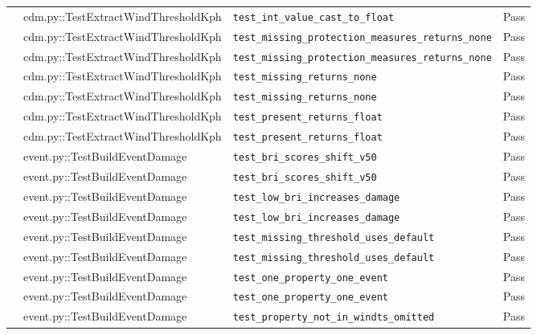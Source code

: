 \documentclass[11pt,a4paper]{article}
\begin{document}
\begin{center}
\begin{longtable}{p{2.2cm} p{4.5cm} p{6.5cm} p{1.4cm}}
     & cdm.py::TestExtractWindThresholdKph & \texttt{test\_int\_value\_cast\_to\_float} & \textcolor{green!60!black}{Pass} \\
     & cdm.py::TestExtractWindThresholdKph & \texttt{test\_missing\_protection\_measures\_returns\_none} & \textcolor{green!60!black}{Pass} \\
     & cdm.py::TestExtractWindThresholdKph & \texttt{test\_missing\_protection\_measures\_returns\_none} & \textcolor{green!60!black}{Pass} \\
     & cdm.py::TestExtractWindThresholdKph & \texttt{test\_missing\_returns\_none} & \textcolor{green!60!black}{Pass} \\
     & cdm.py::TestExtractWindThresholdKph & \texttt{test\_missing\_returns\_none} & \textcolor{green!60!black}{Pass} \\
     & cdm.py::TestExtractWindThresholdKph & \texttt{test\_present\_returns\_float} & \textcolor{green!60!black}{Pass} \\
     & cdm.py::TestExtractWindThresholdKph & \texttt{test\_present\_returns\_float} & \textcolor{green!60!black}{Pass} \\
     & event.py::TestBuildEventDamage & \texttt{test\_bri\_scores\_shift\_v50} & \textcolor{green!60!black}{Pass} \\
     & event.py::TestBuildEventDamage & \texttt{test\_bri\_scores\_shift\_v50} & \textcolor{green!60!black}{Pass} \\
     & event.py::TestBuildEventDamage & \texttt{test\_low\_bri\_increases\_damage} & \textcolor{green!60!black}{Pass} \\
     & event.py::TestBuildEventDamage & \texttt{test\_low\_bri\_increases\_damage} & \textcolor{green!60!black}{Pass} \\
     & event.py::TestBuildEventDamage & \texttt{test\_missing\_threshold\_uses\_default} & \textcolor{green!60!black}{Pass} \\
     & event.py::TestBuildEventDamage & \texttt{test\_missing\_threshold\_uses\_default} & \textcolor{green!60!black}{Pass} \\
     & event.py::TestBuildEventDamage & \texttt{test\_one\_property\_one\_event} & \textcolor{green!60!black}{Pass} \\
     & event.py::TestBuildEventDamage & \texttt{test\_one\_property\_one\_event} & \textcolor{green!60!black}{Pass} \\
     & event.py::TestBuildEventDamage & \texttt{test\_property\_not\_in\_windts\_omitted} & \textcolor{green!60!black}{Pass} \\

\end{longtable}
\end{center}
\end{document}
